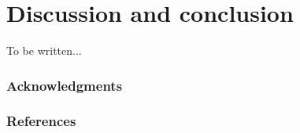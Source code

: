 \documentclass{article} %
\begin{document}
\section{Discussion and conclusion}
To be written...


\subsubsection*{Acknowledgments}



\subsubsection*{References}




\end{document}
